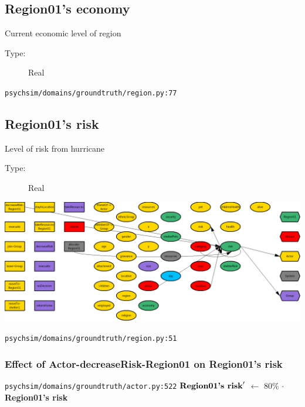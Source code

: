 \documentclass{article}%
\begin{document}
%
\subsection{Region01's economy}%
\label{subsec:Region01's economy}%
Current economic level of region%
\begin{description}%
\item[Type:]%
Real%
\end{description}%
\begin{flushleft}%
\verb|psychsim/domains/groundtruth/region.py:77|%
\end{flushleft}

%
\subsection{Region01's risk}%
\label{subsec:Region01's risk}%
Level of risk from hurricane%
\begin{description}%
\item[Type:]%
Real%
\end{description}%
\includegraphics[width=\textwidth]{images/riskOfRegion01.png}%
\begin{flushleft}%
\verb|psychsim/domains/groundtruth/region.py:51|%
\end{flushleft}%
\subsubsection{Effect of Actor{-}decreaseRisk{-}Region01 on Region01's risk}%
\label{ssubsec:Effect of Actor{-}decreaseRisk{-}Region01 on Region01's risk}%
\begin{flushleft}%
\verb|psychsim/domains/groundtruth/actor.py:522|%
\linebreak%
$\mbox{\textbf{Region01's risk}} '$%
$\leftarrow$%
80\%%
$\cdot$%
\textbf{Region01's risk}%
\end{flushleft}

%
\end{document}
